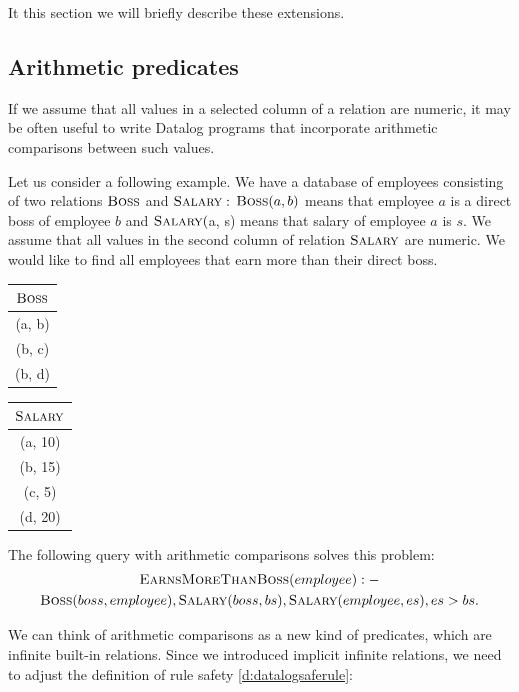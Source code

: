 \documentclass{pracamgr}
\theoremstyle{plain}
\theoremstyle{definition}
\theoremstyle{remark}
\newcommand{\assign}{:-}
\newcommand{\relat}[2]{$\textsc{#1}#2$}
\begin{document}
It this section we will briefly describe these extensions.

\subsection{Arithmetic predicates}
If we assume that all values in a selected column of a relation are numeric, it may be often useful to write Datalog programs that incorporate arithmetic comparisons between such values.

Let us consider a following example. We have a database of employees consisting of two relations \relat{Boss}{} and \relat{Salary}: \relat{Boss}{(a, b)} means that employee $a$ is a direct boss of employee $b$ and \relat{Salary}(a, s) means that salary of employee $a$ is $s$. We assume that all values in the second column of relation \relat{Salary}{} are numeric. We would like to find all employees that earn more than their direct boss.

\begin{center}
\begin{tabular}{|c|}
\hline
\relat{Boss}{} \\
\hline
(a, b)\\
(b, c)\\
(b, d)\\
\hline
\end{tabular}
\quad
\begin{tabular}{|c|}
\hline
\relat{Salary}{} \\
\hline
(a, 10)\\
(b, 15)\\
(c, 5)\\
(d, 20)\\
\hline
\end{tabular}
\end{center}

The following query with arithmetic comparisons solves this problem:
\begin{multline*}
\textsc{EarnsMoreThanBoss} (employee) \assign \\ \textsc{Boss}(boss, employee), \textsc{Salary}(boss, bs), \textsc{Salary}(employee, es), es > bs. \\
\end{multline*}

We can think of arithmetic comparisons as a new kind of predicates, which are infinite built-in relations. Since we introduced implicit infinite relations, we need to adjust the definition of rule safety \ref{d:datalogsaferule}:
\end{document}
